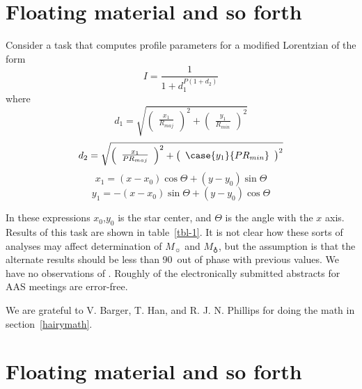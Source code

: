 \section{Floating material and so forth}

Consider a task that computes profile parameters for a modified
Lorentzian of the form
\begin{equation}
I = \frac{1}{1 + d_{1}^{P (1 + d_{2} )}}
\end{equation}
where
\begin{displaymath}
d_{1} = \sqrt{ \left( \begin{array}{c} \frac{x_{1}}{R_{maj}} 
\end{array} \right) ^{2} + 
\left( \begin{array}{c} \frac{y_{1}}{R_{min}} \end{array} \right) ^{2} }
\end{displaymath}
\begin{displaymath}
d_{2} = \sqrt{ \left( \begin{array}{c} \frac{x_{1}}{P R_{maj}}
\end{array} \right) ^{2} + 
\left( \begin{array}{c} \case{y_{1}}{P R_{min}} \end{array} \right) ^{2} }
\end{displaymath}
\[x_{1} = (x - x_{0}) \cos \Theta + (y - y_{0}) \sin \Theta \]
\[y_{1} = -(x - x_{0}) \sin \Theta + (y - y_{0}) \cos \Theta \]

In these expressions $x_{0}$,$y_{0}$ is the star center, and $\Theta$ is the
angle with the $x$ axis.  Results of this task are shown in table~\ref{tbl-1}.
It is not clear how these sorts of analyses may affect determination of
$M_{\sun}$ and $M_{\earth}$, but the assumption is that the alternate results
should be less than 90\arcdeg\ out of phase with previous values.
We have no observations of .
Roughly  of the electronically submitted abstracts
for AAS meetings are error-free.


\acknowledgments

We are grateful to V. Barger, T. Han, and R. J. N. Phillips for
doing the math in section~\ref{hairymath}.

\appendix
\section{Floating material and so forth}



